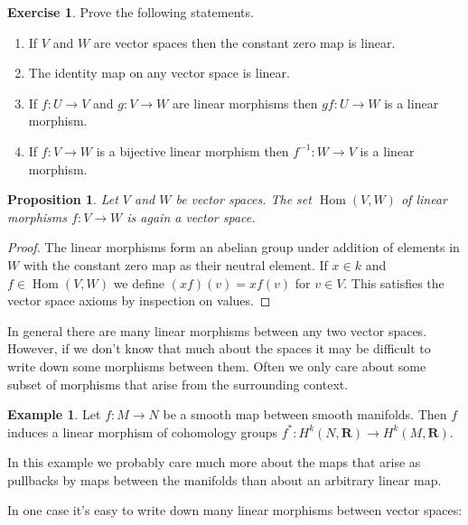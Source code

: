 \documentclass[11pt]{article}
\newtheorem{prop}[theo]{Proposition}
\theoremstyle{definition}
\newtheorem{exam}[theo]{Example}
\newtheorem{exer}[theo]{Exercise}
\def\RR{\mathbf{R}}
\DeclareMathOperator{\Hom}{Hom}
\begin{document}
\begin{exer}
Prove the following statements.
\begin{enumerate}
\item
If $V$ and $W$ are vector spaces then the constant zero map is linear.

\item
The identity map on any vector space is linear.

\item
If $f : U \to V$ and $g : V \to W$ are linear morphisms then $gf : U \to W$ is a linear morphism.

\item
If $f : V \to W$ is a bijective linear morphism then $f^{-1} : W \to V$ is a linear morphism.
\end{enumerate}
\end{exer}



\begin{prop}
Let $V$ and $W$ be vector spaces.
The set $\Hom(V,W)$ of linear morphisms $f : V \to W$ is again a vector space.
\end{prop}

\begin{proof}
The linear morphisms form an abelian group under addition of elements in $W$ with the constant zero map as their neutral element.
If $x \in k$ and $f \in \Hom(V,W)$ we define $(x f)(v) = x f(v)$ for $v \in V$.
This satisfies the vector space axioms by inspection on values.
\end{proof}



In general there are many linear morphisms between any two vector spaces.
However, if we don't know that much about the spaces it may be difficult to write down some morphisms between them.
Often we only care about some subset of morphisms that arise from the surrounding context.

\begin{exam}
Let $f : M \to N$ be a smooth map between smooth manifolds.
Then $f$ induces a linear morphism of cohomology groups $f^* : H^k(N, \RR) \to H^k(M, \RR)$.
\end{exam}

In this example we probably care much more about the maps that arise as pullbacks by maps between the manifolds than about an arbitrary linear map.


In one case it's easy to write down many linear morphisms between vector spaces:
\end{document}
